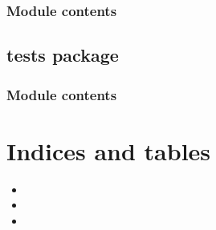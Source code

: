 \documentclass[letterpaper,10pt,english]{sphinxmanual}
\begin{document}
\subsection{Module contents}
\label{\detokenize{bank:module-contents}}\label{\detokenize{bank:module-bank}}

\section{tests package}
\label{\detokenize{tests:tests-package}}\label{\detokenize{tests::doc}}

\subsection{Module contents}
\label{\detokenize{tests:module-tests}}\label{\detokenize{tests:module-contents}}

\chapter{Indices and tables}
\label{\detokenize{index:indices-and-tables}}\begin{itemize}
\item {} 

\item {} 

\item {} 

\end{itemize}
\end{document}
